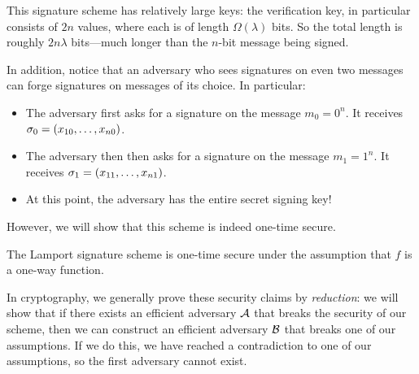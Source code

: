 This signature scheme has relatively large keys:
the verification key, in particular consists of $2n$ values,
where each is of length $\Omega(\lambda)$ bits.
So the total length is roughly $2n\lambda$ bits---much
longer than the $n$-bit message being signed.

In addition, notice that an adversary who sees signatures
on even two messages can forge signatures on messages of its choice.
In particular:
\begin{itemize}[noitemsep]
  \item The adversary first asks for a signature on the message $m_0 = 0^n$.
It receives $\sigma_0 = (x_{10}, \ldots, x_{n0})$.
  \item The adversary then then asks for a signature on the message $m_1 = 1^n$.
    It receives $\sigma_1 = (x_{11}, \ldots, x_{n1})$.
  \item At this point, the adversary has the entire secret signing key! 
\end{itemize}
However, we will show that this scheme is indeed one-time secure.

\begin{claim} 
The Lamport signature scheme is one-time secure under the
assumption that $f$ is a one-way function.
\end{claim}

In cryptography, we generally prove these security
claims by \emph{reduction}: we will show that
if there exists an efficient adversary $\mathcal{A}$
that breaks the security of our scheme,
then we can construct an efficient adversary $\mathcal{B}$ 
that breaks one of our assumptions.
If we do this, we have reached a contradiction to one
of our assumptions, so the first adversary cannot exist.

